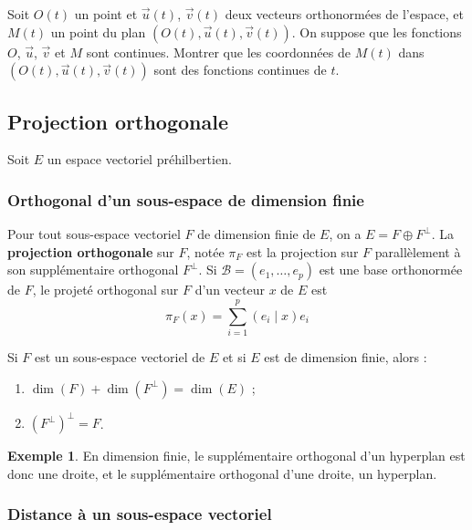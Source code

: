 \documentclass[french]{article}
\theoremstyle{plain}
\theoremstyle{definition}
\newtheorem*{ex}{Exemple}
\theoremstyle{remark}
\begin{document}
\begin{exo}
	Soit $O(t)$ un point et $\overrightarrow{u}(t)$, $\overrightarrow{v}(t)$ deux vecteurs orthonormées de l'espace, et $M(t)$ un point du plan $(O(t),\overrightarrow{u}(t),\overrightarrow{v}(t))$. On suppose que les fonctions $O$, $\overrightarrow{u}$, $\overrightarrow{v}$ et $M$ sont continues. Montrer que les coordonnées de $M(t)$ dans $(O(t),\overrightarrow{u}(t),\overrightarrow{v}(t))$ sont des fonctions continues de $t$.
\end{exo}

\subsection{Projection orthogonale}

Soit $E$ un espace vectoriel préhilbertien.

\subsubsection*{Orthogonal d'un sous-espace de dimension finie}

\begin{thm}
	Pour tout sous-espace vectoriel $F$ de dimension finie de $E$, on a $E=F\oplus F^\bot$. La \textbf{projection orthogonale} sur $F$, notée $\pi_F$ est la projection sur $F$ parallèlement à son supplémentaire orthogonal $F^\bot$. Si $\mathcal{B}=(e_1,\ldots,e_p)$ est une base orthonormée de $F$, le projeté orthogonal sur $F$ d'un vecteur $x$ de $E$ est $$\pi_F(x)=\sum_{i=1}^{p}(e_i\mid x)e_i$$
\end{thm}

\begin{prop}
	Si $F$ est un sous-espace vectoriel de $E$ et si $E$ est de dimension finie, alors :
	\begin{enumerate}
		\item $\dim(F)+\dim(F^\bot)=\dim(E)$ ;
		\item $(F^\bot)^\bot=F$.
	\end{enumerate}
\end{prop}

\begin{ex}
	En dimension finie, le supplémentaire orthogonal d'un hyperplan est donc une droite, et le supplémentaire orthogonal d'une droite, un hyperplan.
\end{ex}

\subsubsection*{Distance à un sous-espace vectoriel}
\end{document}
